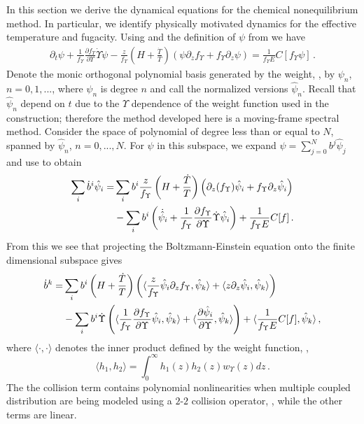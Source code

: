 \label{dynamicsSec}
In this section we derive the dynamical equations for the chemical nonequilibrium method. In particular, we identify physically motivated dynamics for the effective temperature and fugacity. Using  and the definition of $\psi$ from  we have
\begin{align}\label{nearEquilibEq}
\partial_t \psi+\frac{1}{f_\Upsilon }\frac{\partial f_\Upsilon }{\partial\Upsilon}\dot\Upsilon\psi-\frac{z}{f_\Upsilon }\left(H+\frac{\dot{T}}{T}\right)\left(\psi\partial_zf_\Upsilon +f_\Upsilon \partial_z \psi\right)=\frac{1}{f_\Upsilon E}C[f_\Upsilon \psi]\,.
\end{align}
Denote the monic orthogonal polynomial basis generated by the weight, , by $\psi_n$, $n=0,1,...$, where $\psi_n$ is degree $n$ and call the normalized versions  $\hat{\psi}_n$. Recall that $\hat\psi_n$ depend on $t$ due to the $\Upsilon$ dependence of the weight function used in the construction; therefore the method developed here is a moving-frame spectral method. Consider the space of polynomial of degree less than or equal to $N$, spanned by $\hat\psi_n$, $n=0,...,N$.   For $\psi$ in this subspace, we expand $\psi=\sum_{j=0}^Nb^j\hat\psi_j$ and use   to obtain
\begin{align}\label{Tvars}
\sum_i \dot{b}^i\hat\psi_i=&\sum_ib^i\frac{z}{f_\Upsilon }\left(H+\frac{\dot{T}}{T}\right)\left(\partial_z(f_\Upsilon )\hat\psi_i+f_\Upsilon \partial_z\hat\psi_i\right)\\
&-\sum_ib^i\left(\dot{\hat{\psi}}_i+\frac{1}{f_\Upsilon }\frac{\partial f_\Upsilon }{\partial\Upsilon}\dot\Upsilon\hat\psi_i\right)+\frac{1}{f_\Upsilon E}C[f]\,.
\notag
\end{align}
From this we see  that  projecting the Boltzmann-Einstein equation onto the finite dimensional subspace gives
\begin{align}
\dot b^k=& \sum_i b^i\left(H+\frac{\dot{T}}{T}\right)\left(\langle\frac{z}{f_\Upsilon }\hat\psi_i\partial_zf_\Upsilon ,\hat\psi_k\rangle+\langle z\partial_z \hat\psi_i,\hat\psi_k\rangle\right) \\
&-\sum_i b^i\dot{\Upsilon}\left(\langle\frac{1}{f_\Upsilon }\frac{\partial f_\Upsilon }{\partial\Upsilon}\hat\psi_i,\hat\psi_k\rangle+\langle\frac{\partial\hat{\psi}_i}{\partial \Upsilon},\hat\psi_k\rangle\right)+\langle\frac{1}{f_\Upsilon E}C[f],\hat\psi_k\rangle\notag\,,
\end{align}
where $\langle\cdot,\cdot\rangle$ denotes the inner product defined by the weight function, ,
\begin{equation}
\langle h_1,h_2\rangle=\int_0^\infty h_1(z)h_2(z)w_\Upsilon(z)dz\,.
\end{equation}
The the collision term contains polynomial nonlinearities when multiple coupled distribution are being modeled using a $2$-$2$ collision operator, , while the other terms are linear.  

